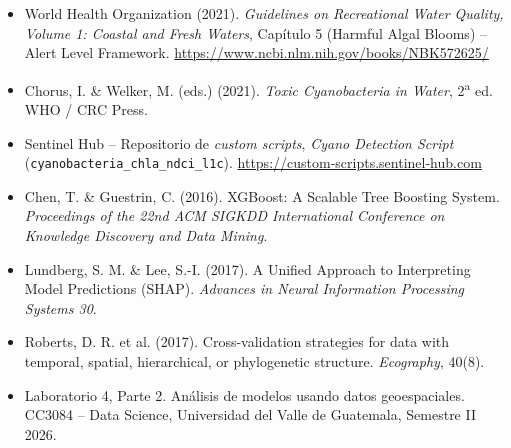\documentclass[11pt]{article}
\begin{document}
\begin{itemize}
    \item World Health Organization (2021). \emph{Guidelines on Recreational Water Quality, Volume 1: Coastal and Fresh Waters}, Capítulo 5 (Harmful Algal Blooms) -- Alert Level Framework. \url{https://www.ncbi.nlm.nih.gov/books/NBK572625/}
    \item Chorus, I. \& Welker, M. (eds.) (2021). \emph{Toxic Cyanobacteria in Water}, 2\textsuperscript{a} ed. WHO / CRC Press.
    \item Sentinel Hub -- Repositorio de \emph{custom scripts}, \emph{Cyano Detection Script} (\texttt{cyanobacteria\_chla\_ndci\_l1c}). \url{https://custom-scripts.sentinel-hub.com}
    \item Chen, T. \& Guestrin, C. (2016). XGBoost: A Scalable Tree Boosting System. \emph{Proceedings of the 22nd ACM SIGKDD International Conference on Knowledge Discovery and Data Mining}.
    \item Lundberg, S. M. \& Lee, S.-I. (2017). A Unified Approach to Interpreting Model Predictions (SHAP). \emph{Advances in Neural Information Processing Systems 30}.
    \item Roberts, D. R. et al. (2017). Cross-validation strategies for data with temporal, spatial, hierarchical, or phylogenetic structure. \emph{Ecography}, 40(8).
    \item Laboratorio 4, Parte 2. Análisis de modelos usando datos geoespaciales. CC3084 -- Data Science, Universidad del Valle de Guatemala, Semestre II 2026.
\end{itemize}
\end{document}
